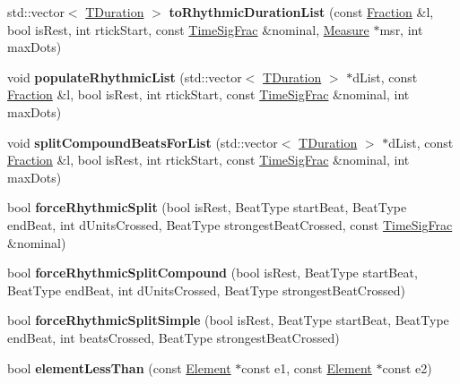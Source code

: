 \begin{DoxyCompactItemize}
std\+::vector$<$ \hyperlink{class_ms_1_1_t_duration}{T\+Duration} $>$ {\bfseries to\+Rhythmic\+Duration\+List} (const \hyperlink{class_ms_1_1_fraction}{Fraction} \&l, bool is\+Rest, int rtick\+Start, const \hyperlink{class_ms_1_1_time_sig_frac}{Time\+Sig\+Frac} \&nominal, \hyperlink{class_ms_1_1_measure}{Measure} $\ast$msr, int max\+Dots)
\item 
\mbox{\label{namespace_ms_ade86088df7c2d7fa76876791c873ce06}} 
void {\bfseries populate\+Rhythmic\+List} (std\+::vector$<$ \hyperlink{class_ms_1_1_t_duration}{T\+Duration} $>$ $\ast$d\+List, const \hyperlink{class_ms_1_1_fraction}{Fraction} \&l, bool is\+Rest, int rtick\+Start, const \hyperlink{class_ms_1_1_time_sig_frac}{Time\+Sig\+Frac} \&nominal, int max\+Dots)
\item 
\mbox{\label{namespace_ms_a4bb33fbd3707e343829b1618c518cd72}} 
void {\bfseries split\+Compound\+Beats\+For\+List} (std\+::vector$<$ \hyperlink{class_ms_1_1_t_duration}{T\+Duration} $>$ $\ast$d\+List, const \hyperlink{class_ms_1_1_fraction}{Fraction} \&l, bool is\+Rest, int rtick\+Start, const \hyperlink{class_ms_1_1_time_sig_frac}{Time\+Sig\+Frac} \&nominal, int max\+Dots)
\item 
\mbox{\label{namespace_ms_a402887282f894d33f8e5c4c93bde5a9d}} 
bool {\bfseries force\+Rhythmic\+Split} (bool is\+Rest, Beat\+Type start\+Beat, Beat\+Type end\+Beat, int d\+Units\+Crossed, Beat\+Type strongest\+Beat\+Crossed, const \hyperlink{class_ms_1_1_time_sig_frac}{Time\+Sig\+Frac} \&nominal)
\item 
\mbox{\label{namespace_ms_aaa8529990af0d45e36aa05695233ef2e}} 
bool {\bfseries force\+Rhythmic\+Split\+Compound} (bool is\+Rest, Beat\+Type start\+Beat, Beat\+Type end\+Beat, int d\+Units\+Crossed, Beat\+Type strongest\+Beat\+Crossed)
\item 
\mbox{\label{namespace_ms_a263f28bd7b7284e03ceb489fbff32eed}} 
bool {\bfseries force\+Rhythmic\+Split\+Simple} (bool is\+Rest, Beat\+Type start\+Beat, Beat\+Type end\+Beat, int beats\+Crossed, Beat\+Type strongest\+Beat\+Crossed)
\item 
\mbox{\label{namespace_ms_a043567da093e3157ef81be2d3d641bb2}} 
bool {\bfseries element\+Less\+Than} (const \hyperlink{class_ms_1_1_element}{Element} $\ast$const e1, const \hyperlink{class_ms_1_1_element}{Element} $\ast$const e2)

\end{DoxyCompactItemize}
